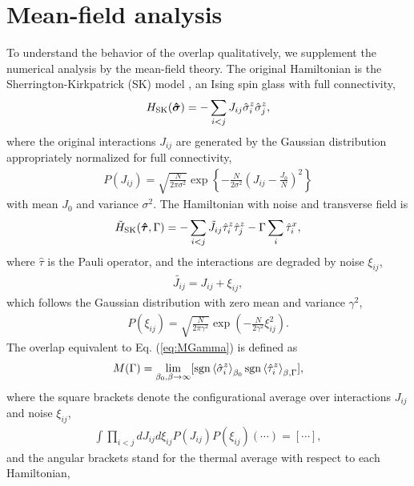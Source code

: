 \documentclass[aps,pra,twocolumn,groupedaddress,longbibliography]{revtex4}
\def\v#1{\mbox{\boldmath $#1$}}
\newcommand{\Sig}{\sigma}
\begin{document}
\section{Mean-field analysis} 
\label{sec:mfa}

To understand the behavior of the overlap qualitatively, we supplement the numerical analysis by the mean-field theory. The original Hamiltonian is the Sherrington-Kirkpatrick (SK) model \cite{skmodel,nsmrbook}, an Ising spin glass with full connectivity,
\begin{align}
	\label{eq:SK_S}
	H_{\mathrm{SK}}(\v{\hat{\Sig}}) = -\sum_{i<j}J_{ij}\hat{\Sig}_{i}^z\hat{\Sig}_{j}^z,
\end{align}
where the original interactions $J_{ij}$ are generated by the Gaussian distribution appropriately normalized for full connectivity,
\begin{align}
	P(J_{ij}) = \sqrt{\frac{N}{2\pi \sigma^2}}\exp\left\{-\frac{N}{2\sigma^2}\left(J_{ij}-\frac{J_0}{N}\right)^2\right\}
\end{align}
with mean $J_0$ and variance $\sigma^2$. The Hamiltonian with noise and transverse field is
\begin{align}
	\label{eq:SK_tau}
	\tilde{H}_{\mathrm{SK}}(\v{\hat{\tau}}, \Gamma) = -\sum_{i<j}\tilde{J}_{ij}\hat{\tau}_{i}^z\hat{\tau}_{j}^z - \Gamma \sum_{i}\hat{\tau}_{i}^x,
\end{align}
where $\hat{\tau}$ is the Pauli operator, and the interactions are degraded by noise $\xi_{ij}$,
\begin{align}
	\tilde{J_{ij}} = J_{ij}+\xi_{ij},
\end{align}
which follows the Gaussian distribution with zero mean and variance $\gamma^2$,
\begin{align}
	P(\xi_{ij}) = \sqrt{\frac{N}{2\pi \gamma^2}}\exp\left(-\frac{N}{2\gamma^2} \xi_{ij}^2\right).
\end{align}
The overlap equivalent to Eq. (\ref{eq:MGamma}) is defined as
\begin{align}
	M(\Gamma) = \lim_{\beta_0, \beta \to \infty} [\mathrm{sgn}\braket{\hat{\Sig}_{i}^z}_{\beta_0}\mathrm{sgn}\braket{\hat{\tau}_{i}^z}_{\beta, \Gamma}],
\end{align}
where the square brackets denote the configurational average over interactions $J_{ij}$ and noise $\xi_{ij}$,
\begin{align}
	\int \prod_{i<j}dJ_{ij}d\xi_{ij}P(J_{ij})P(\xi_{ij})(\cdots) = [\cdots],
\end{align}
and the angular brackets stand for the thermal average with respect to each Hamiltonian,
\end{document}
